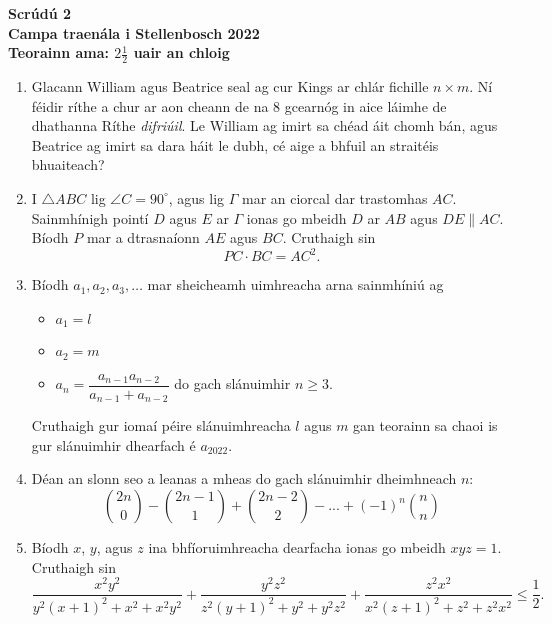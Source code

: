 \documentclass{article}
\begin{document}
\thispagestyle{empty}

\begin{center}
  \textbf{\Large Scrúdú 2}
  \\ \vspace{1em}
  \textbf{\large Campa traenála i Stellenbosch 2022}
  \\ \vspace{1em}
  \textbf{\large Teorainn ama: $2\frac{1}{2}$ uair an chloig}
\end{center}

\bigskip

\vfill

\begin{enumerate}[itemsep=\fill]

\item %
Glacann William agus Beatrice seal ag cur Kings ar chlár fichille $n \times m$.
Ní féidir ríthe a chur ar aon cheann de na 8 gcearnóg in aice láimhe de dhathanna Ríthe \emph{difriúil}.
Le William ag imirt sa chéad áit chomh bán, agus Beatrice ag imirt sa dara háit le dubh, cé aige a bhfuil an straitéis bhuaiteach?


\item %
I $\triangle ABC$ lig $\angle C = 90^\circ$, agus lig $\Gamma$ mar an ciorcal dar trastomhas $AC$.
Sainmhínigh pointí $D$ agus $E$ ar $\Gamma$ ionas go mbeidh $D$ ar $AB$ agus $DE \parallel AC$.
Bíodh $P$ mar a dtrasnaíonn $AE$ agus $BC$.
Cruthaigh sin
\[ PC \cdot BC = AC^2. \]

\vspace{0pt}


\item %
Bíodh $a_1, a_2, a_3, \dots$ mar sheicheamh uimhreacha arna sainmhíniú ag
\begin{itemize}
    \item $a_1 = l$
    \item $a_2 = m$
    \item $a_n = \dfrac{a_{n-1}a_{n-2}}{a_{n-1}+a_{n-2}}$ do gach slánuimhir $n \geq 3$.
\end{itemize}
Cruthaigh gur iomaí péire slánuimhreacha $l$ agus $m$ gan teorainn sa chaoi is gur slánuimhir dhearfach é $a_{2022}$.


\item %
Déan an slonn seo a leanas a mheas do gach slánuimhir dheimhneach $n$:
\[ {2n \choose 0} -{2n-1 \choose 1}+{2n-2 \choose 2}-...+(-1)^n{n\choose n} \]


\vspace{0pt}


\item %
Bíodh $x$, $y$, agus $z$ ina bhfíoruimhreacha dearfacha ionas go mbeidh $xyz = 1$.
Cruthaigh sin
\[ \frac{x^2y^2}{y^2(x+1)^2+x^2+x^2y^2} +\frac{y^2z^2}{z^2(y+1)^2+y^2+y^2z^2} +\frac{z^2x^2}{x^2(z+1)^2+z^2+z^2x^2} \leq \frac{1}{2}. \]

\end{enumerate}
\end{document}
